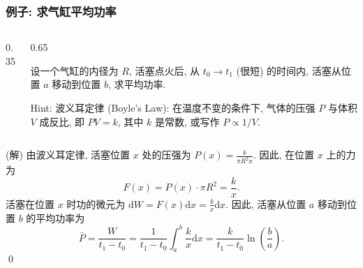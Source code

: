 \begin{frame}
\frametitle{例子: 求气缸平均功率}

\begin{columns}
\begin{column}{0.35\textwidth}
\end{column}
\begin{column}{0.65\textwidth}
\begin{question}
设一个气缸的内径为 $R$, 活塞点火后, 从 $t_0 \to t_1$ (很短) 的时间内, 活塞从位置 $a$ 移动到位置 $b$, 求平均功率.
\end{question}
\pause
Hint: 波义耳定律 (Boyle's Law): 在温度不变的条件下, 气体的压强 $P$ 与体积 $V$ 成反比, 即 $PV = k$, 其中 $k$ 是常数, 或写作 $P \propto 1/V$.
\end{column}
\end{columns}

\pause

\startproof[bg=yellow, fg=red](解)
由波义耳定律, 活塞位置 $x$ 处的压强为 $P(x) = \frac{k}{\pi R^2 x}$. 因此, 在位置 $x$ 上的力为
\[
F(x) = P(x) \cdot \pi R^2 = \frac{k}{x}.
\]
活塞在位置 $x$ 时功的微元为 $\mathrm{d}W = F(x) \mathrm{d}x = \frac{k}{x} \mathrm{d}x$. 因此, 活塞从位置 $a$ 移动到位置 $b$ 的平均功率为
\[
\bar{P} = \frac{W}{t_1 - t_0} = \frac{1}{t_1 - t_0} \int_a^b \frac{k}{x} \mathrm{d}x = \frac{k}{t_1 - t_0} \ln\left(\frac{b}{a}\right).
\]
\qed

\end{frame}


